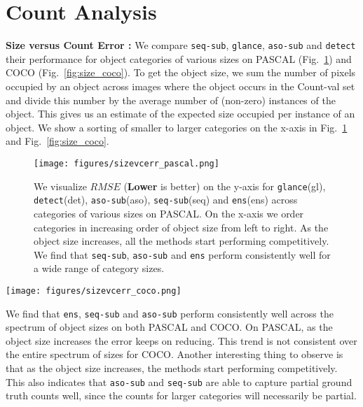 \documentclass[10pt,twocolumn,letterpaper]{article}
\newcommand{\detect}{\texttt{detect}\xspace}
\newcommand{\sub}{\texttt{aso-sub}\xspace}
\newcommand{\seq}{\texttt{seq-sub}\xspace}
\newcommand{\glance}{\texttt{glance}\xspace}
\newcommand{\ens}{\texttt{ens}\xspace}
\newcommand{\reffig}[1]{Fig.~\ref{#1}}
\begin{document}
\section{Count Analysis}\label{sec:under_over}
\textbf{Size versus Count Error : }
We compare \seq, \glance, \sub and \detect their performance for object categories of various sizes on PASCAL (\reffig{fig:size_pascal}) and COCO (\reffig{fig:size_coco}). To get the object size, we sum the number of pixels occupied by an object across images where the object occurs in the Count-val set and divide this number by the average number of (non-zero) instances of the object. This gives us an estimate of the expected size occupied per instance of an object. We show a sorting of smaller to larger categories on the x-axis in \reffig{fig:size_pascal} and \reffig{fig:size_coco}. 
\begin{figure}
\texttt{[image: figures/sizevcerr\_pascal.png]}
\caption{We visualize $RMSE$ (\textbf{Lower} is better) on the y-axis for \glance (gl), \detect (det), \sub (aso), \seq (seq) and \ens (ens) across categories of various sizes on PASCAL. On the x-axis we order categories in increasing order of object size from left to right. As the object size increases, all the methods start performing competitively. We find that \seq, \sub and \ens perform consistently well for a wide range of category sizes.}
\label{fig:size_pascal}
\end{figure}
\begin{figure*}
\texttt{[image: figures/sizevcerr\_coco.png]}
\caption{We visualize $RMSE$ (\textbf{Lower} is better) on the y-axis for \glance (gl), \detect (det), \sub (aso), \seq (seq) and \ens (ens) across categories of various sizes on COCO. On the x-axis we order categories in increasing order of object size from left to right. We find that \seq, \sub and \ens perform consistently well for a wide range of category sizes.}
\label{fig:size_coco}
\end{figure*}
We find that \ens, \seq and \sub perform consistently well across the spectrum of object sizes on both PASCAL and COCO. On PASCAL, as the object size increases the error keeps on reducing. This trend is not consistent over the entire spectrum of sizes for COCO. Another interesting thing to observe is that as the object size increases, the methods start performing competitively. This also indicates that \sub and \seq are able to capture partial ground truth counts well, since the counts for larger categories will necessarily be partial.
\end{document}
